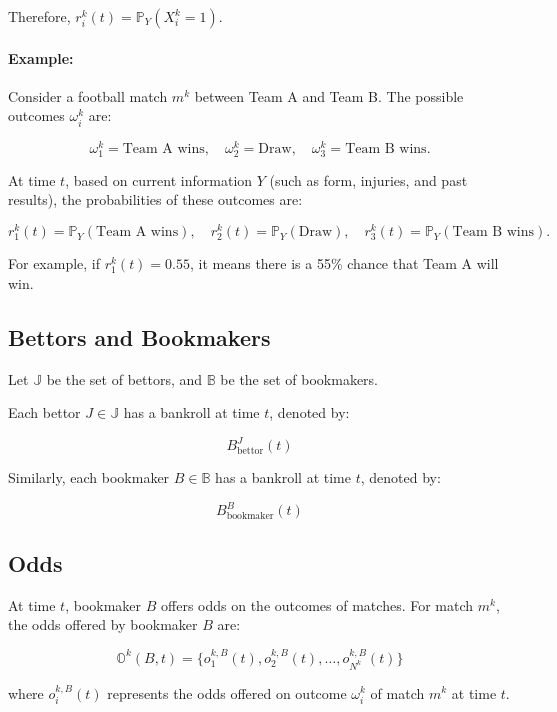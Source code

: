 Therefore, \( r_i^k(t) = \mathbb{P}_Y( X_i^k = 1 ) \). \\

\paragraph{Example:} 
Consider a football match \( m^k \) between Team A and Team B. The possible outcomes \( \omega_i^k \) are:

\[
\omega_1^k = \text{Team A wins}, \quad \omega_2^k = \text{Draw}, \quad \omega_3^k = \text{Team B wins}.
\]

At time \( t \), based on current information \( Y \) (such as form, injuries, and past results), the probabilities of these outcomes are:

\[
r_1^k(t) = \mathbb{P}_Y(\text{Team A wins}), \quad r_2^k(t) = \mathbb{P}_Y(\text{Draw}), \quad r_3^k(t) = \mathbb{P}_Y(\text{Team B wins}).
\]

For example, if \( r_1^k(t) = 0.55 \), it means there is a 55\% chance that Team A will win.

\subsection{Bettors and Bookmakers}

Let \( \mathbb{J} \) be the set of bettors, and \( \mathbb{B} \) be the set of bookmakers.

Each bettor \( J \in \mathbb{J} \) has a bankroll at time \( t \), denoted by:

\[
B_{\text{bettor}}^J(t)
\]

Similarly, each bookmaker \( B \in \mathbb{B} \) has a bankroll at time \( t \), denoted by:

\[
B_{\text{bookmaker}}^B(t)
\]

\subsection{Odds}

At time \( t \), bookmaker \( B \) offers odds on the outcomes of matches. For match \( m^k \), the odds offered by bookmaker \( B \) are:

\[
\mathbb{O}^k(B, t) = \{ o_1^{k,B}(t), o_2^{k,B}(t), \dots, o_{N^k}^{k,B}(t) \}
\]

where \( o_i^{k,B}(t) \) represents the odds offered on outcome \( \omega_i^k \) of match \( m^k \) at time \( t \). \\

